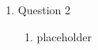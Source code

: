 \documentclass[12pt]{article}
\begin{document}
\begin{enumerate}
\begin{enumerate}
  \end{enumerate}

  

\pagebreak

\item Question 2
  \begin{enumerate}
    \item placeholder
  \end{enumerate}

\end{enumerate}
\end{document}
